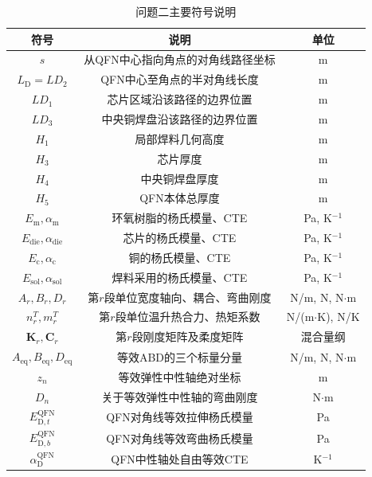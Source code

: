 \documentclass[draft,12pt,a4paper]{ctexart}
\theoremstyle{definition}
\begin{document}
\begin{table}[H]\centering
  \caption{问题二主要符号说明}\label{tab:symbol-q2}
  \small
  \begin{tabular}{ccc}
    \toprule
    符号 & 说明 & 单位 \\
    \midrule
    $s$ & 从QFN中心指向角点的对角线路径坐标 & m \\
    $L_{\mathrm D}=LD_2$ & QFN中心至角点的半对角线长度 & m \\
    $LD_1$ & 芯片区域沿该路径的边界位置 & m \\
    $LD_3$ & 中央铜焊盘沿该路径的边界位置 & m \\
    $H_1$ & 局部焊料几何高度 & m \\
    $H_3$ & 芯片厚度 & m \\
    $H_4$ & 中央铜焊盘厚度 & m \\
    $H_5$ & QFN本体总厚度 & m \\
    $E_{\mathrm m},\alpha_{\mathrm m}$ & 环氧树脂的杨氏模量、CTE & Pa, K$^{-1}$ \\
    $E_{\mathrm{die}},\alpha_{\mathrm{die}}$ & 芯片的杨氏模量、CTE & Pa, K$^{-1}$ \\
    $E_{\mathrm c},\alpha_{\mathrm c}$ & 铜的杨氏模量、CTE & Pa, K$^{-1}$ \\
    $E_{\mathrm{sol}},\alpha_{\mathrm{sol}}$ & 焊料采用的杨氏模量、CTE & Pa, K$^{-1}$ \\
    $A_r,B_r,D_r$ & 第$r$段单位宽度轴向、耦合、弯曲刚度 & N/m, N, N$\cdot$m \\
    $n_r^T,m_r^T$ & 第$r$段单位温升热合力、热矩系数 & N/(m$\cdot$K), N/K \\
    $\mathbf K_r,\mathbf C_r$ & 第$r$段刚度矩阵及柔度矩阵 & 混合量纲 \\
    $A_{\mathrm{eq}},B_{\mathrm{eq}},D_{\mathrm{eq}}$ & 等效ABD的三个标量分量 & N/m, N, N$\cdot$m \\
    $z_n$ & 等效弹性中性轴绝对坐标 & m \\
    $D_n$ & 关于等效弹性中性轴的弯曲刚度 & N$\cdot$m \\
    $E_{\mathrm D,t}^{\mathrm{QFN}}$ & QFN对角线等效拉伸杨氏模量 & Pa \\
    $E_{\mathrm D,b}^{\mathrm{QFN}}$ & QFN对角线等效弯曲杨氏模量 & Pa \\
    $\alpha_{\mathrm D}^{\mathrm{QFN}}$ & QFN中性轴处自由等效CTE & K$^{-1}$ \\
    \bottomrule
  \end{tabular}
\end{table}
\end{document}
